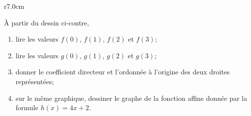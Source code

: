 
\begin{exercice}\label{exosmath-0511}

\begin{wrapfigure}{r}{7.0cm}
   \vspace{-1.5cm}        %
   \centering
   
\end{wrapfigure}

À partir du dessin ci-contre,
\begin{enumerate}
    \item
        lire les valeurs \( f(0)\), \( f(1)\), \( f(2)\) et \( f(3)\);
    \item
        lire les valeurs \( g(0)\), \( g(1)\), \( g(2)\) et \( g(3)\);
    \item
        donner le coefficient directeur et l'ordonnée à l'origine des deux droites représentées;
    \item
       sur le même graphique, dessiner le graphe de la fonction affine donnée par la formule \( h(x)=4x+2\).
\end{enumerate}

\end{exercice}

\vspace{2.5cm}  %

